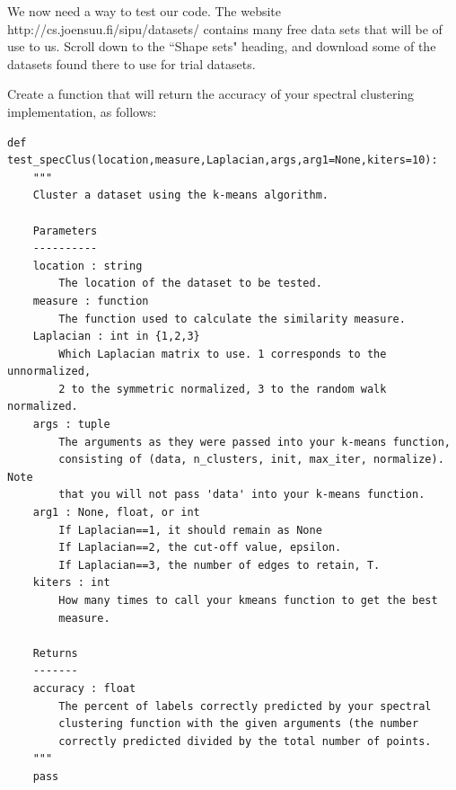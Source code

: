We now need a way to test our code.  The website http://cs.joensuu.fi/sipu/datasets/ contains many free data sets that will be of use to us.  Scroll down to the ``Shape sets" heading, and download some of the datasets found there to use for trial datasets.
\begin{problem}{}{}
Create a function that will return the accuracy of your spectral clustering implementation, as follows:
\begin{lstlisting}
def test_specClus(location,measure,Laplacian,args,arg1=None,kiters=10):
    """
    Cluster a dataset using the k-means algorithm.

    Parameters
    ----------
    location : string
        The location of the dataset to be tested.
    measure : function
        The function used to calculate the similarity measure.
    Laplacian : int in {1,2,3}
        Which Laplacian matrix to use. 1 corresponds to the unnormalized,
        2 to the symmetric normalized, 3 to the random walk normalized.
    args : tuple
        The arguments as they were passed into your k-means function,
        consisting of (data, n_clusters, init, max_iter, normalize). Note
        that you will not pass 'data' into your k-means function.
    arg1 : None, float, or int
        If Laplacian==1, it should remain as None
        If Laplacian==2, the cut-off value, epsilon.
        If Laplacian==3, the number of edges to retain, T.
    kiters : int
        How many times to call your kmeans function to get the best
        measure.

    Returns
    -------
    accuracy : float
        The percent of labels correctly predicted by your spectral
        clustering function with the given arguments (the number
        correctly predicted divided by the total number of points.
    """
    pass
\end{lstlisting}
\end{problem}
